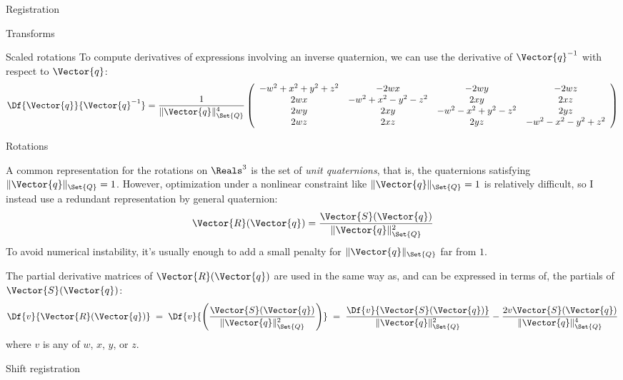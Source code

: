\begin{plSection}{Registration}
\begin{plSection}{Transforms}
\begin{plSection}{Scaled rotations}
To compute derivatives of expressions
involving an inverse quaternion,
we can use the derivative of $\Vector{q}^{-1}$
with respect to $\Vector{q}$:
\begin{equation}
\Df{\Vector{q}}{\Vector{q}^{-1}}
=
{1 \over {\| \Vector{q} \|_{\Set{Q}}^4}}
\left(
\begin{array}{cccc}
-w^2+x^2+y^2+z^2 & -2wx              & -2wy              & -2wz \\
 2wx             & -w^2+x^2-y^2-z^2  &  2xy              &  2xz \\
 2wy             &   2xy             & -w^2-x^2+y^2-z^2  &  2yz \\
 2wz             &   2xz             &  2yz              &  -w^2-x^2-y^2+z^2 \\
\end{array}
\right)
\end{equation}

\end{plSection}%
\begin{plSection}{Rotations}
\label{sec:Rotations}

A common representation for the rotations on $\Reals^3$
is the set of {\it unit quaternions},
that is, the quaternions satisfying $\| \Vector{q} \|_{\Set{Q}} = 1$.
However, optimization under a nonlinear constraint
like $\| \Vector{q} \|_{\Set{Q}} = 1$ is relatively difficult,
so I instead use a redundant representation by general quaternion:
\begin{equation}
\Vector{R}(\Vector{q}) = {{\Vector{S}(\Vector{q})} \over {\| \Vector{q} \|_{\Set{Q}}^2}}
\end{equation}
To avoid numerical instability, it's usually enough
to add a small penalty for $\| \Vector{q} \|_{\Set{Q}}$ far from $1$.

The partial derivative matrices of $\Vector{R}(\Vector{q})$ are used in the
same way as,
and can be expressed in terms of,
the partials of $\Vector{S}(\Vector{q})$:
\begin{equation}
\Df{v}{\Vector{R}(\Vector{q})}
\; = \;
\Df{v}{\left(
{{\Vector{S}(\Vector{q})} \over {\| \Vector{q} \|_{\Set{Q}}^2}}
\right)}
\; = \;
{{\Df{v}{\Vector{S}(\Vector{q})}} \over {\| \Vector{q} \|_{\Set{Q}}^2}}
-
{{2v \Vector{S}(\Vector{q})} \over {\| \Vector{q} \|_{\Set{Q}}^4}}
\end{equation}
where $v$ is any of $w$, $x$, $y$, or $z$.

\end{plSection}%
\begin{plSection}{Shift registration}
\label{sec:Shift-registration}


\end{plSection}
\end{plSection}
\end{plSection}
